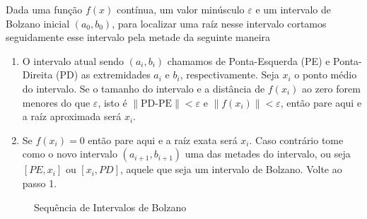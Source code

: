 \documentclass[
  letterpaper,
  DIV=11,
  numbers=noendperiod]{scrreprt}
\begin{document}
\begin{tcolorbox}[enhanced jigsaw, toptitle=1mm, opacitybacktitle=0.6, arc=.35mm, breakable, left=2mm, leftrule=.75mm, title={Algoritmo da Bissecção}, coltitle=black, colback=white, rightrule=.15mm, colframe=quarto-callout-important-color-frame, titlerule=0mm, bottomtitle=1mm, bottomrule=.15mm, toprule=.15mm, colbacktitle=quarto-callout-important-color!10!white, opacityback=0]

Dada uma função \(f(x)\) contínua, um valor minúsculo \(\varepsilon\) e
um intervalo de Bolzano inicial \((a_{0},b_{0})\), para localizar uma
raíz nesse intervalo cortamos seguidamente esse intervalo pela metade da
seguinte maneira

\begin{enumerate}
\def\labelenumi{\arabic{enumi}.}
\item
  O intervalo atual sendo \((a_{i},b_{i})\) chamamos de Ponta-Esquerda
  (PE) e Ponta-Direita (PD) as extremidades \(a_{i}\) e \(b_{i}\),
  respectivamente. Seja \(x_{i}\) o ponto médio do intervalo. Se o
  tamanho do intervalo e a distância de \(f(x_{i})\) ao zero forem
  menores do que \(\varepsilon\), isto é
  \(\|\mbox{PD-PE}\|<\varepsilon\) e \(\|f(x_{i})\|<\varepsilon\), então
  pare aqui e a raíz aproximada será \(x_{i}\).
\item
  Se \(f(x_{i})=0\) então pare aqui e a raíz exata será \(x_{i}\). Caso
  contrário tome como o novo intervalo \((a_{i+1},b_{i+1})\) uma das
  metades do intervalo, ou seja \([PE,x_{i}]\) ou \([x_{i} ,PD]\),
  aquele que seja um intervalo de Bolzano. Volte ao passo 1.
\end{enumerate}

\end{tcolorbox}

\begin{figure}


\caption{\label{fig-SeqInt}Sequência de Intervalos de Bolzano}

\end{figure}%
\end{document}
